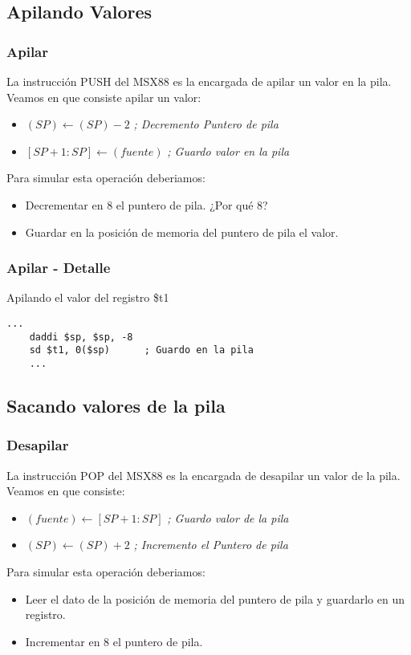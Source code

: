 \documentclass{beamer}
\begin{document}
\subsection{Apilando Valores}
\begin{frame}
\frametitle{Apilar}
La instrucción PUSH del MSX88 es la encargada de apilar un valor en la pila. Veamos en que consiste apilar un valor:
\begin{itemize}
\item $(SP) \xleftarrow{} (SP) - 2$ \emph{; Decremento Puntero de pila}
\item $[SP+1:SP] \xleftarrow{} (fuente)$ \emph{; Guardo valor en la pila}
\end{itemize}
Para simular esta operación deberiamos:
\begin{itemize}
\item Decrementar en 8 el puntero de pila. ¿Por qué 8?
\item Guardar en la posición de memoria del puntero de pila el valor.
\end{itemize}

\end{frame}

\begin{frame}[fragile]
\frametitle{Apilar - Detalle}


\begin{block}{Apilando el valor del registro \$t1}
\begin{lstlisting}[language=WinMIPS64,basicstyle=\ttfamily,keywordstyle=\color{blue}]
    ...
    daddi $sp, $sp, -8
    sd $t1, 0($sp)      ; Guardo en la pila
    ...
\end{lstlisting}
\end{block}

\end{frame}



\subsection{Sacando valores de la pila}
\begin{frame}
\frametitle{Desapilar}
La instrucción POP del MSX88 es la encargada de desapilar un valor de la pila. Veamos en que consiste:
\begin{itemize}
\item $(fuente) \xleftarrow{} [SP+1:SP]$ \emph{; Guardo valor de la pila}
\item $(SP) \xleftarrow{} (SP) + 2$ \emph{; Incremento el Puntero de pila}
\end{itemize}
Para simular esta operación deberiamos:
\begin{itemize}
\item Leer el dato de la posición de memoria del puntero de pila y guardarlo en un registro.
\item Incrementar en 8 el puntero de pila.
\end{itemize}
\end{frame}
\end{document}
